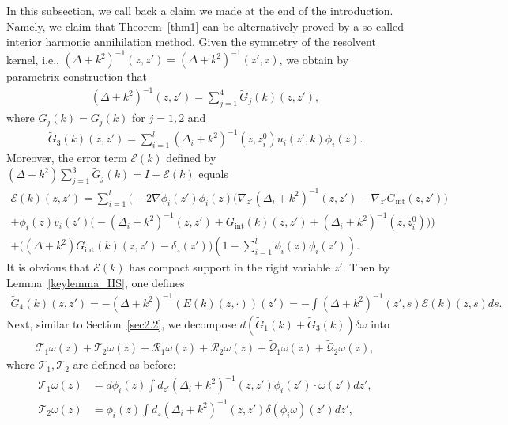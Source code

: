 \documentclass[12pt]{amsart}
\begin{document}
In this subsection, we call back a claim we made at the end of the introduction. Namely, we claim that Theorem~\ref{thm1} can be alternatively proved by a so-called interior harmonic annihilation method. Given the symmetry of the resolvent kernel, i.e., $(\Delta+k^2)^{-1}(z,z') = (\Delta+k^2)^{-1}(z',z)$, we obtain by parametrix construction that
\begin{align*}
    (\Delta+k^2)^{-1}(z,z') = \sum_{j=1}^4 \tilde{G}_j(k)(z,z'),
\end{align*}
where $\tilde{G}_j(k) = G_j(k)$ for $j=1,2$ and 
\begin{align*}
    \tilde{G}_3(k)(z,z') = \sum_{i=1}^l (\Delta_{i} +k^2)^{-1}(z, z_i^0) u_i(z',k)\phi_i(z).
\end{align*}
Moreover, the error term $\mathcal{E}(k)$ defined by $(\Delta+k^2)\sum_{j=1}^3 \tilde{G}_j(k) = I + \mathcal{E}(k)$ equals
\begin{align*}
\mathcal{E}(k)(z,z') = \sum_{i = 1}^l \Big( -2 \nabla \phi_i(z') \phi_i(z) \big(\nabla_{z'} (\Delta_{i} + k^2)^{-1}(z,z') - \nabla_{z'} G_{\textrm{int}}(z,z')\big)\\ 
    +\phi_i(z) v_i(z') \big( -(\Delta_{i} + k^2)^{-1}(z,z') + G_{\textrm{int}}(k)(z,z') + (\Delta_{i} + k^2)^{-1}(z, z_i^0)\big) \Big)\\ 
    + \big( (\Delta + k^2)G_{\textrm{int}}(k)(z,z') - \delta_{z}(z')\big) \left(1-\sum_{i=1}^l \phi_i(z)\phi_i(z')\right).
\end{align*}
It is obvious that $\mathcal{E}(k)$ has compact support in the right variable $z'$. Then by Lemma~\ref{keylemma_HS}, one defines \begin{align*}
    \tilde{G}_4(k)(z,z') = - (\Delta+k^2)^{-1} \left(E(k)(z, \cdot)\right)(z') = - \int (\Delta + k^2)^{-1}(z',s) \mathcal{E}(k)(z,s) ds.
\end{align*} 
Next, similar to Section~\ref{sec2.2}, we decompose $d \left(\tilde{G}_1(k)+\tilde{G}_3(k) \right) \delta \omega$ into 
\begin{align*}
    \mathcal{T}_1\omega(z) + \mathcal{T}_2 \omega(z) + \tilde{\mathcal{R}}_1 \omega(z) + \tilde{\mathcal{R}}_2 \omega(z) + \tilde{\mathcal{Q}}_1 \omega(z) + \tilde{\mathcal{Q}}_2 \omega(z),
\end{align*}
where $\mathcal{T}_1, \mathcal{T}_2$ are defined as before:
\begin{align*}
    \mathcal{T}_1 \omega(z) &= d\phi_i(z)\int d_{z'}(\Delta_i +k^2)^{-1}(z,z') \phi_i(z')\cdot \omega(z') dz',\\
    \mathcal{T}_2 \omega(z) &= \phi_i(z) \int d_{z}(\Delta_i +k^2)^{-1}(z,z') \delta(\phi_i \omega)(z') dz',
\end{align*}
\end{document}
